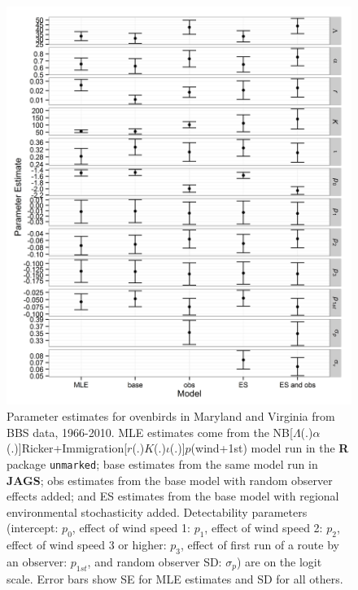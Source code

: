 \documentclass{article}
\begin{document}
\clearpage
\begin{figure}
  \centering
  \includegraphics[width=6.5in]{oven_par_est}
\caption{Parameter estimates for ovenbirds in Maryland and Virginia from BBS data, 1966-2010.  
MLE estimates come from the NB[$\Lambda$(.)$\alpha$(.)]Ricker+Immigration[$r$(.)$K$(.)$\iota$(.)]$p$(wind+1st) 
model run in the \textbf{R} package \texttt{unmarked}; base estimates from the same model run in \textbf{JAGS};
obs estimates from the base model with random observer effects added; and ES estimates from the base
model with regional environmental stochasticity added.  Detectability parameters (intercept: $p_{0}$, 
effect of wind speed 1: $p_{1}$, effect of wind speed 2: $p_{2}$, effect of wind speed 3 or higher: $p_{3}$, 
effect of first run of a route by an observer: $p_{1st}$, and random observer SD: $\sigma_{p}$) are on the 
logit scale. Error bars show SE for MLE estimates and SD for all others.}
\label{fig:oven_par_est}
\end{figure}
\end{document}
